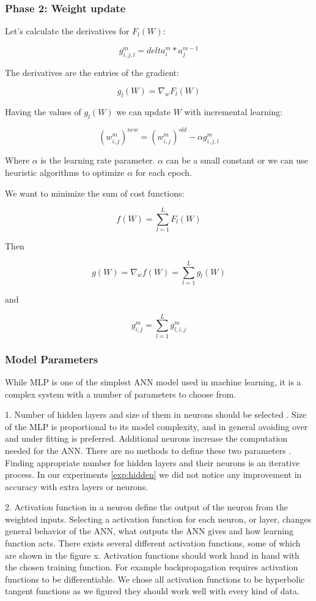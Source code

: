 \subsubsection{Phase 2: Weight update}

Let’s calculate the derivatives for $F_l(W)$:

\[ g_{i,j,l}^m = delta_i^m * a_j^{m-1} \]

The derivatives are the entries of the gradient:

\[ g_l(W) = \nabla_w F_l(W) \]

Having the values of $g_l(W)$ we can update $W$ with incremental learning:

\[ (w_{i,j}^m)^{new} = (w_{i,j}^m)^{old} - \alpha g_{i,j,l}^m \]

Where $\alpha$ is the learning rate parameter. $\alpha$ can be a small constant or we can use heuristic algorithms to optimize $\alpha$ for each epoch.

We want to minimize the sum of cost functions:

\[ f(W) = \sum_{l = 1}^L F_l (W) \]

Then

\[ g(W) = \nabla_w f(W) = \sum_{l = 1}^L g_l (W) \]

and

\[ g_{i,j}^m = \sum _{l = 1}^L g_{l,i,j}^m \]

 \cite{hongwei} \cite{wiki:mlp} \cite{wiki:backprop}


\subsubsection{Model Parameters}

While MLP is one of the simplest ANN model used in machine learning, it is a complex system with a number of parameters to choose from.

1. Number of hidden layers and size of them in neurons should be selected \cite{hiddenunits} .  Size of the MLP is proportional to its model complexity, and in general avoiding over and under fitting is preferred. Additional neurons increase the computation needed for the ANN. There are no methods to define these two parameters \cite{hiddenunits} . Finding appropriate number for hidden layers and their neurons is an iterative process. In our experiments \ref{exp:hidden} we did not notice any improvement in accuracy  with extra layers or neurons.

2. Activation function in a neuron define the output of the neuron from the weighted inputs. Selecting a activation function for each neuron, or layer,  changes general behavior of the ANN, what outputs the ANN gives and how learning function acts. There exists several different activation functions, some of which are shown in the figure x. Activation functions should work hand in hand with the chosen training function. For example backpropagation requires activation functions to be differentiable. We chose all activation functions to be hyperbolic tangent functions as we figured they should work well with every kind of data.

